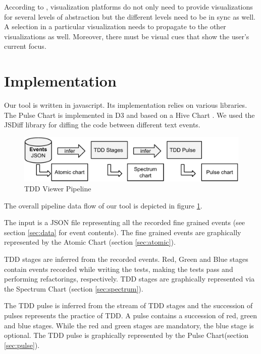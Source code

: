 \documentclass[journal]{vgtc}                %
\begin{document}
According to \cite{two}, visualization platforms do not only need to provide visualizations for several levels of abstraction but the different levels need to be in sync as well.
A selection in a particular visualization needs to propagate to the other visualizations as well.
Moreover, there must be visual cues that show the user's current focus.



\section{Implementation}

Our tool is written in javascript.
Its implementation relies on various libraries.
The Pulse Chart is implemented in D3 \cite{three} and based on a Hive Chart \cite{four}.
We used the JSDiff library \cite{five} for diffing the code between different text events.

\begin{figure}[H]
	\includegraphics[width=\columnwidth]{implementation}
	\caption{TDD Viewer Pipeline}
	\label{fig:tool_pipeline}
\end{figure}

The overall pipeline data flow of our tool is depicted in figure \ref{fig:tool_pipeline}.

The input is a JSON file representing all the recorded fine grained events (see section \ref{sec:data} for event contents).
The fine grained events are graphically represented by the Atomic Chart (section \ref{sec:atomic}).

TDD stages are inferred from the recorded events.
Red, Green and Blue stages contain events recorded while writing the tests, making the tests pass and performing refactorings, respectively.
TDD stages are graphically represented via the Spectrum Chart (section \ref{sec:spectrum}).

The TDD pulse is inferred from the stream of TDD stages and the succession of pulses represents the practice of TDD.
A pulse contains a succession of red, green and blue stages.
While the red and green stages are mandatory, the blue stage is optional.
The TDD pulse is graphically represented by the Pulse Chart(section \ref{sec:pulse}).
\end{document}
